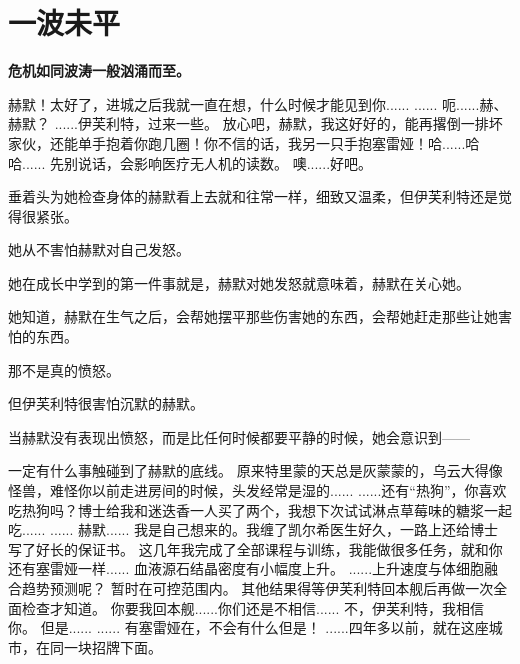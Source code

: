 \documentclass[openany]{book}
\begin{document}
\chapter{一波未平}
\begin{center} \textbf{危机如同波涛一般汹涌而至。}\end{center} \par
\clearpage
\begin{dialogue}
     赫默！太好了，进城之后我就一直在想，什么时候才能见到你......
     ......
     呃......赫、赫默？
     ......伊芙利特，过来一些。
     放心吧，赫默，我这好好的，能再撂倒一排坏家伙，还能单手抱着你跑几圈！你不信的话，我另一只手抱塞雷娅！哈......哈哈......
     先别说话，会影响医疗无人机的读数。
     噢......好吧。\par
    垂着头为她检查身体的赫默看上去就和往常一样，细致又温柔，但伊芙利特还是觉得很紧张。\par
    她从不害怕赫默对自己发怒。\par
    她在成长中学到的第一件事就是，赫默对她发怒就意味着，赫默在关心她。\par
    她知道，赫默在生气之后，会帮她摆平那些伤害她的东西，会帮她赶走那些让她害怕的东西。\par
    那不是真的愤怒。\par
    但伊芙利特很害怕沉默的赫默。\par
    当赫默没有表现出愤怒，而是比任何时候都要平静的时候，她会意识到——\par
    一定有什么事触碰到了赫默的底线。
     原来特里蒙的天总是灰蒙蒙的，乌云大得像怪兽，难怪你以前走进房间的时候，头发经常是湿的......
     ......还有“热狗”，你喜欢吃热狗吗？博士给我和迷迭香一人买了两个，我想下次试试淋点草莓味的糖浆一起吃......
     ......
     赫默......
     我是自己想来的。我缠了凯尔希医生好久，一路上还给博士写了好长的保证书。
     这几年我完成了全部课程与训练，我能做很多任务，就和你还有塞雷娅一样......
     血液源石结晶密度有小幅度上升。
     ......上升速度与体细胞融合趋势预测呢？
     暂时在可控范围内。
     其他结果得等伊芙利特回本舰后再做一次全面检查才知道。
     你要我回本舰......你们还是不相信......
     不，伊芙利特，我相信你。
     但是......
     ......
     有塞雷娅在，不会有什么但是！
     ......四年多以前，就在这座城市，在同一块招牌下面。

\end{dialogue}
\end{document}
